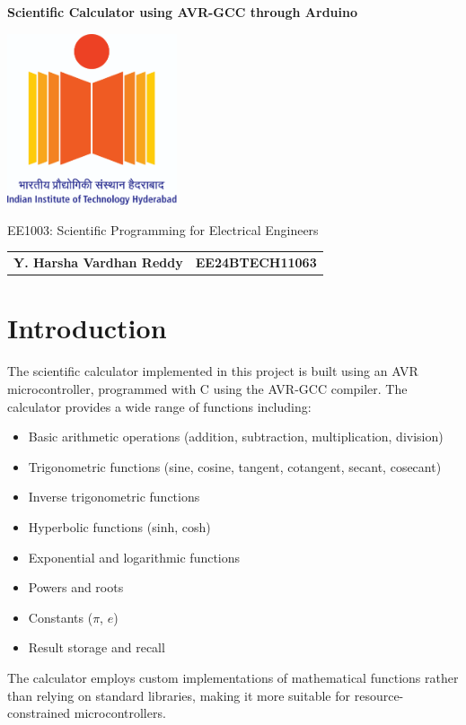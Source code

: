\documentclass[12pt]{article}
\begin{document}
\begin{titlepage}
    \centering
    {\Large \bfseries  Scientific Calculator using AVR-GCC through Arduino

 \par}
    \vspace{1cm}
    \includegraphics[width=5cm]{figs/logo.jpg} %
    \vspace{1cm}
   
    
   
    {\large EE1003: Scientific Programming for Electrical Engineers\par}
    \vspace{2cm}
   
\begin{tabular}{ll}
    \textbf{Y. Harsha Vardhan Reddy} & \textbf{EE24BTECH11063} \\
\end{tabular}
\vspace{1cm}
\end{titlepage}

\newpage
\tableofcontents
\newpage
\section{Introduction}
The scientific calculator implemented in this project is built using an AVR microcontroller, programmed with C using the AVR-GCC compiler. The calculator provides a wide range of functions including:
\begin{itemize}
\item Basic arithmetic operations (addition, subtraction, multiplication, division)
\item Trigonometric functions (sine, cosine, tangent, cotangent, secant, cosecant)
\item Inverse trigonometric functions
\item Hyperbolic functions (sinh, cosh)
\item Exponential and logarithmic functions
\item Powers and roots
\item Constants ($\pi$, $e$)
\item Result storage and recall
\end{itemize}
The calculator employs custom implementations of mathematical functions rather than relying on standard libraries, making it more suitable for resource-constrained microcontrollers.
\end{document}
